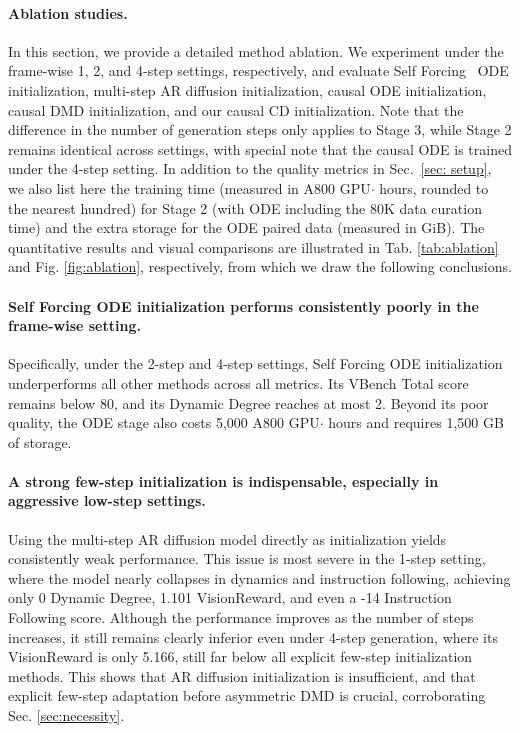 \paragraph{Ablation studies.} 
In this section, we provide a detailed method ablation. We experiment under the frame-wise 1, 2, and 4-step settings, respectively, and evaluate Self Forcing~\cite{huang2025self} ODE initialization, multi-step AR diffusion initialization, causal ODE initialization, causal DMD initialization, and our causal CD initialization. Note that the difference in the number of generation steps only applies to Stage 3, while Stage 2 remains identical across settings, with special note that the causal ODE is trained under the 4-step setting. In addition to the quality metrics in Sec.~\ref{sec: setup}, we also list here the training time (measured in A800 GPU$\cdot$ hours,  rounded to the nearest hundred) for Stage 2 (with ODE including the 80K data curation time) and the extra storage for the ODE paired data (measured in GiB). The quantitative results and visual comparisons are illustrated in Tab. \ref{tab:ablation} and Fig. \ref{fig:ablation}, respectively, from which we draw the following conclusions.

\paragraph{Self Forcing ODE initialization performs consistently poorly in the frame-wise setting.} Specifically, under the 2-step and 4-step settings, Self Forcing ODE initialization underperforms all other methods across all metrics. Its VBench Total score remains below 80, and its Dynamic Degree reaches at most 2. Beyond its poor quality, the ODE stage also costs 5,000 A800 GPU$\cdot$ hours and requires 1,500 GB of storage.


\paragraph{A strong few-step initialization is indispensable, especially in aggressive low-step settings.}
Using the multi-step AR diffusion model directly as initialization yields consistently weak performance. This issue is most severe in the 1-step setting, where the model nearly collapses in dynamics and instruction following, achieving only 0 Dynamic Degree, 1.101 VisionReward, and even a -14 Instruction Following score. Although the performance improves as the number of steps increases, it still remains clearly inferior even under 4-step generation, where its VisionReward is only 5.166, still far below all explicit few-step initialization methods. This shows that AR diffusion initialization is insufficient, and that explicit few-step adaptation before asymmetric DMD is crucial, corroborating Sec. \ref{sec:necessity}.

